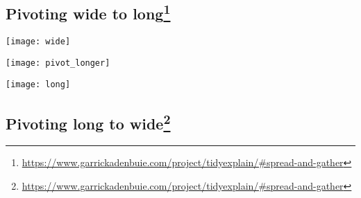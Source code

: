 \documentclass[
  11pt,
]{article}
\begin{document}
\hypertarget{pivoting-wide-to-long}{%
\subsection[Pivoting wide to long]{\texorpdfstring{Pivoting wide to
long\footnote{\url{https://www.garrickadenbuie.com/project/tidyexplain/\#spread-and-gather}}}{Pivoting wide to long}}\label{pivoting-wide-to-long}}

\begin{cols}

\begin{col}{0.32\textwidth}
\texttt{[image: wide]}

\end{col}

\begin{col}{0.01\textwidth}

\vspace{1ex}

\end{col}

\begin{col}{0.32\textwidth}
\texttt{[image: pivot\_longer]}

\end{col}

\begin{col}{0.01\textwidth}

\vspace{1ex}

\end{col}

\begin{col}{0.32\textwidth}
\texttt{[image: long]}

\end{col}

\end{cols}

\hypertarget{pivoting-long-to-wide}{%
\subsection[Pivoting long to wide]{\texorpdfstring{Pivoting long to
wide\footnote{\url{https://www.garrickadenbuie.com/project/tidyexplain/\#spread-and-gather}}}{Pivoting long to wide}}\label{pivoting-long-to-wide}}
\end{document}
